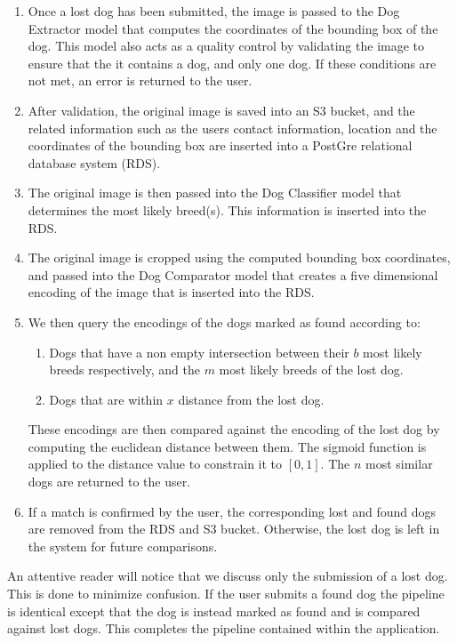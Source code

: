 \documentclass{article}
\begin{document}
\begin{enumerate}
  
  \item Once a lost dog has been submitted, the image is passed to the Dog Extractor model that computes the coordinates of the bounding box of the dog.  This model also acts as a quality control by validating the image to ensure that the it contains a dog, and only one dog.  If these conditions are not met, an error is returned to the user.
  
  \item After validation, the original image is saved into an S3 bucket, and the related information such as the users contact information, location and the coordinates of the bounding box are inserted into a PostGre relational database system (RDS).
  
  \item The original image is then passed into the Dog Classifier model that determines the most likely breed(s).  This information is inserted into the RDS.
  
  \item The original image is cropped using the computed bounding box coordinates, and passed into the Dog Comparator model that creates a five dimensional encoding of the image that is inserted into the RDS.
  
  \item We then query the encodings of the dogs marked as found according to:
  
  \begin{enumerate}
      \item Dogs that have a non empty intersection between their $b$ most likely breeds respectively, and the $m$ most likely breeds of the lost dog.
      \item Dogs that are within $x$ distance from the lost dog.
  \end{enumerate}

   These encodings are then compared against the encoding of the lost dog by computing the euclidean distance between them.  The sigmoid function is applied to the distance value to constrain it to $[0,1]$.  The $n$ most similar dogs are returned to the user.
  
  \item If a match is confirmed by the user, the corresponding lost and found dogs are removed from the RDS and S3 bucket.  Otherwise, the lost dog is left in the system for future comparisons.
 
\end{enumerate}
An attentive reader will notice that we discuss only the submission of a lost dog.  This is done to minimize confusion.  If the user submits a found dog the pipeline is identical except that the dog is instead marked as found and is compared against lost dogs.  This completes the pipeline contained within the application. 
\end{document}
